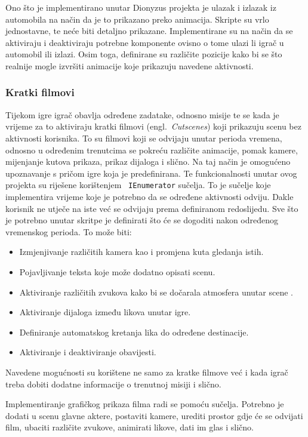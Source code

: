 Ono što je implementirano unutar Dionyzus projekta je ulazak i izlazak iz automobila
na način da je to prikazano preko animacija. Skripte su vrlo jednostavne, te neće
biti detaljno prikazane. Implementirane su na način da se aktiviraju i deaktiviraju
potrebne komponente ovisno o tome ulazi li igrač u automobil ili izlazi. Osim toga,
definirane su različite pozicije kako bi se što realnije mogle izvršiti animacije
koje prikazuju navedene aktivnosti.

 \subsubsection*{Kratki filmovi}
Tijekom igre igrač obavlja određene zadatake, odnosno misije te se kada je vrijeme
za to aktiviraju kratki filmovi (engl.~\textit{Cutscenes}) koji prikazuju scenu bez
aktivnosti korisnika. To su filmovi koji se odvijaju unutar perioda vremena, odnosno
u određenim trenutcima se pokreću različite animacije, pomak kamere, mijenjanje
kutova prikaza, prikaz dijaloga i slično. Na taj način je omogućeno upoznavanje s
pričom igre koja je predefinirana. Te funkcionalnosti unutar ovog projekta su
riješene korištenjem ~\texttt{IEnumerator} sučelja. To je sučelje koje implementira vrijeme
koje je potrebno da se određene aktivnosti odviju. Dakle korisnik ne utječe na iste
već se odvijaju prema definiranom redoslijedu. Sve što je potrebno unutar skritpe je
definirati što će se dogoditi nakon određenog vremenskog perioda. To može biti:
 \begin{itemize}
  \item Izmjenjivanje različitih kamera kao i promjena kuta gledanja istih.
  \item Pojavljivanje teksta koje može dodatno opisati scenu.
  \item Aktiviranje različitih zvukova kako bi se dočarala atmosfera unutar scene .
  \item Aktiviranje dijaloga između likova unutar igre.
  \item Definiranje automatskog kretanja lika do određene destinacije.
  \item Aktiviranje i deaktiviranje obavijesti.
 \end{itemize}
Navedene mogućnosti su korištene ne samo za kratke filmove već i kada igrač treba
dobiti dodatne informacije o trenutnoj misiji i slično. 

Implementiranje grafičkog prikaza filma radi se pomoću sučelja. Potrebno je dodati u
scenu glavne aktere, postaviti kamere, urediti prostor gdje će se odvijati film,
ubaciti različite zvukove, animirati likove, dati im glas i slično.

